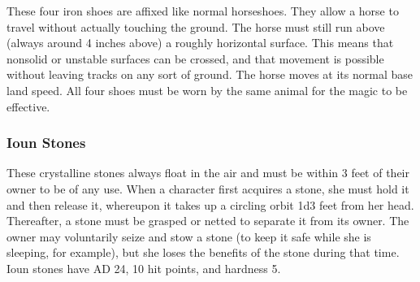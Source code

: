  These four iron shoes are affixed like normal horseshoes. They allow a horse to travel without actually touching the ground. The horse must still run above (always around 4 inches above) a roughly horizontal surface. This means that nonsolid or unstable surfaces can be crossed, and that movement is possible without leaving tracks on any sort of ground. The horse moves at its normal base land speed. All four shoes must be worn by the same animal for the magic to be effective.

\subsubsection{Ioun Stones} These crystalline stones always float in the air and must be within 3 feet of their owner to be of any use. When a character first acquires a stone, she must hold it and then release it, whereupon it takes up a circling orbit 1d3 feet from her head. Thereafter, a stone must be grasped or netted to separate it from its owner. The owner may voluntarily seize and stow a stone (to keep it safe while she is sleeping, for example), but she loses the benefits of the stone during that time. Ioun stones have AD 24, 10 hit points, and hardness 5.

